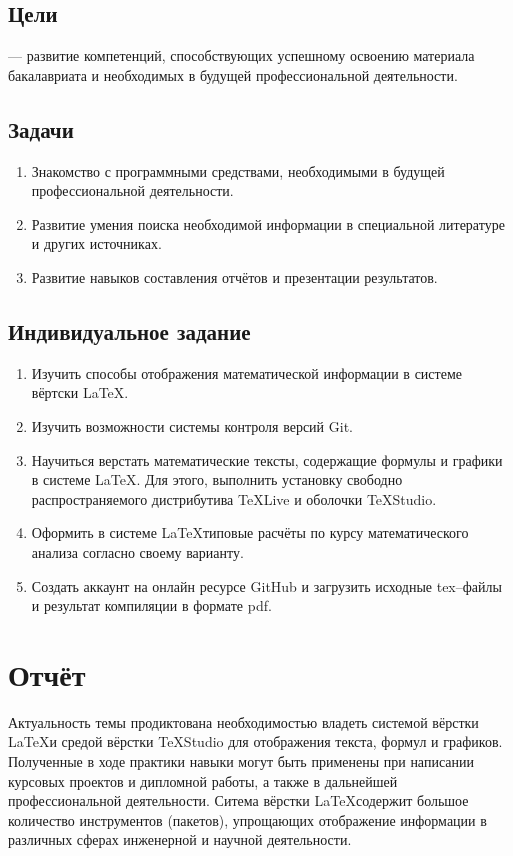 \documentclass[12pt]{article}
\begin{document}
\subsection{Цели}
--- развитие компетенций, способствующих успешному освоению материала бакалавриата и необходимых в будущей профессиональной деятельности.
\subsection{Задачи}
\begin{enumerate}
\item Знакомство с программными средствами, необходимыми в будущей профессиональной деятельности.
\item Развитие умения поиска необходимой информации в специальной литературе и других источниках.
\item Развитие навыков составления отчётов и презентации результатов.
\end{enumerate}
\subsection{Индивидуальное задание}	
\begin{enumerate}
\item Изучить способы отображения математической информации в системе вёртски \LaTeX.
\item Изучить возможности  системы контроля версий \textsf{Git}.
\item Научиться верстать математические тексты, содержащие формулы и графики в системе \LaTeX.
Для этого, выполнить установку свободно распространяемого дистрибутива \textsf{TeXLive} и оболочки \textsf{TeXStudio}.
\item Оформить в системе \LaTeX типовые расчёты по курсу математического анализа согласно своему варианту.
\item Создать аккаунт на онлайн ресурсе \textsf{GitHub} и загрузить исходные \textsf{tex}--файлы 
и результат компиляции в формате \textsf{pdf}.
\end{enumerate} 
\newpage
\section{Отчёт}
Актуальность темы продиктована необходимостью владеть системой вёрстки \LaTeX и средой вёрстки \textsf{TeXStudio} для
отображения текста, формул и графиков. Полученные в ходе практики навыки могут быть применены при написании
курсовых проектов и дипломной работы, а также в дальнейшей профессиональной деятельности.
Ситема вёрстки \LaTeX содержит большое количество инструментов (пакетов), упрощающих отображение информации в различных 
сферах инженерной и научной деятельности. 
\newpage
\end{document}
